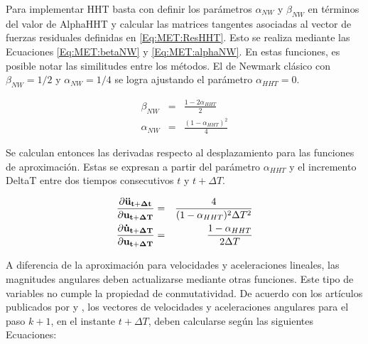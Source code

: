 Para implementar HHT basta con definir los parámetros $\alpha_{NW}$ y $\beta_{NW}$ en términos del valor de \gls{AlphaHHT} y calcular las matrices tangentes asociadas al vector de fuerzas residuales definidas en \ref{Eq:MET:ResHHT}. Esto se realiza mediante las Ecuaciones \eqref{Eq:MET:betaNW} y \eqref{Eq:MET:alphaNW}. En estas funciones, es posible notar las similitudes entre los métodos. El de Newmark clásico con $\beta_{NW}=1/2$ y $\alpha_{NW} =1/4$ se logra ajustando el parámetro $\alpha_{HHT}=0$. 

\begin{eqnarray}
\label{Eq:MET:betaNW}
\beta_{NW} &=& \frac{1-2\alpha_{HHT}}{2}\\
\label{Eq:MET:alphaNW}
\alpha_{NW} &=& \frac{(1-\alpha_{HHT})^2}{4}
\end{eqnarray}

Se calculan entonces las derivadas respecto al desplazamiento para las funciones de aproximación. Estas se expresan a partir del parámetro $\alpha_{HHT}$ y el incremento \gls{DeltaT} entre dos tiempos consecutivos $t$ y $t+\Delta T$.

\begin{eqnarray}
\label{Eq:Met:DerivadasAcelLinear}
\frac{\partial \bf{\ddot{u}_{t+\Delta t}}}{\partial \bf{{u}_{t+\Delta T}}}& = &
\frac{4}{(1-\alpha_{HHT})^2 \Delta T^2}\\
\label{Eq:Met:DerivadasVelLinear}
\frac{\partial \bf{\dot{u}_{t+\Delta T}}}{\partial \bf{{u}_{t+\Delta T}}}& = &
\frac{1-\alpha_{HHT}}{2\Delta T}
\end{eqnarray}

A diferencia de la aproximación para velocidades y aceleraciones lineales, las magnitudes angulares deben actualizarse mediante otras funciones. Este tipo de variables no cumple la propiedad de conmutatividad. De acuerdo con los artículos publicados por \cite{ibrahimbegovic1998finite} y \cite{ibrahimbegovic2002energy}, los vectores de velocidades y aceleraciones angulares para el paso $k+1$, en el instante $t+\Delta T$, deben calcularse según las siguientes Ecuaciones:


